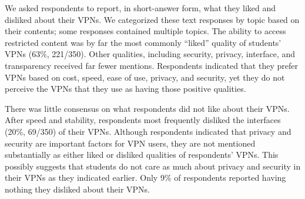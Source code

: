 We asked respondents to report, in short-answer form, what they liked and disliked about their VPNs. We categorized these text responses by topic based on their contents; some responses contained multiple topics. The ability to access restricted content was by far the most commonly “liked” quality of students’ VPNs (63\%, 221/350). Other qualities, including security, privacy, interface, and transparency received far fewer mentions. Respondents indicated that they prefer VPNs based on cost, speed, ease of use, privacy, and security, yet they do not perceive the VPNs that they use as having those positive qualities.

There was little consensus on what respondents did not like about their VPNs. After speed and stability, respondents most frequently disliked the interfaces (20\%, 69/350) of their VPNs. Although respondents indicated that privacy and security are important factors for VPN users, they are not mentioned substantially as either liked or disliked qualities of respondents’ VPNs. This possibly suggests that students do not care as much about privacy and security in their VPNs as they indicated earlier. Only 9\% of respondents reported having nothing they disliked about their VPNs.





